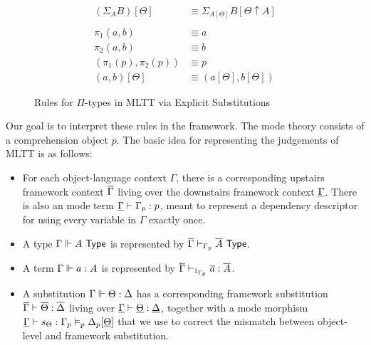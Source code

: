 \documentclass[10pt]{article}
\theoremstyle{definition}
\newcommand{\yields}{\vdash}
\newcommand{\TYPE}{\,\,\mathsf{Type}}
\begin{document}
\begin{figure}
\begin{align}
(\Sigma_A B)[\Theta] &\equiv \Sigma_{A[\Theta]} B[\Theta \uparrow A] \\
\nonumber\\
\pi_1(a, b) &\equiv a \\
\pi_2(a, b) &\equiv b \\
(\pi_1(p), \pi_2(p)) &\equiv p \\
(a, b)[\Theta] &\equiv (a[\Theta], b[\Theta])
\end{align}
\caption{Rules for $\Pi$-types in MLTT via Explicit Substitutions}\label{fig:qit-sigma-rules}
\end{figure}

Our goal is to interpret these rules in the framework. The mode theory consists of a comprehension object $p$. The basic idea for representing the judgements of MLTT is as follows:
\begin{itemize}
\item For each object-language context $\Gamma$, there is a corresponding upstairs framework context $\overline{\Gamma}$ living over the downstairs framework context $\underline{\Gamma}$. There is also an mode term $\downstairs{\Gamma} \yields \asdep{\Gamma} : p$, meant to represent a dependency descriptor for using every variable in $\Gamma$ exactly once.

\item A type $\Gamma \qyields A \TYPE$ is represented by $\upstairs{\Gamma} \yields_{\asdep{\Gamma}} \upstairs{A} \TYPE$.
  
\item A term $\Gamma \Vdash a : A$ is represented by $\upstairs{\Gamma} \yields_{1_{\asdep{\Gamma}}} \upstairs{a} : \upstairs{A}$.

\item A substitution $\Gamma \Vdash \Theta : \Delta$ has a corresponding framework substitution $\upstairs{\Gamma} \yields \upstairs{\Theta} : \upstairs{\Delta}$ living over $\downstairs{\Gamma} \yields \downstairs{\Theta} : \downstairs{\Delta}$, together with a mode morphism $\downstairs{\Gamma} \yields s_\Theta : \asdep{\Gamma} \vDash_p \asdep{\Delta}[\downstairs{\Theta}]$ that we use to correct the mismatch between object-level and framework substitution.
\end{itemize}
\end{document}
